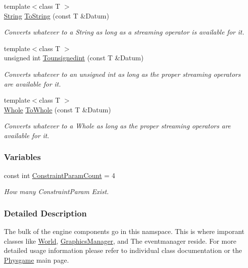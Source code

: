 \begin{DoxyCompactItemize}
{\footnotesize template$<$class T $>$ }\\\hyperlink{namespacephys_aa03900411993de7fbfec4789bc1d392e}{String} \hyperlink{namespacephys_ae81e34843c6c569026b9a7d9d54c4f04}{ToString} (const T \&Datum)
\begin{DoxyCompactList}\small\item\em Converts whatever to a String as long as a streaming operator is available for it. \item\end{DoxyCompactList}\item 
{\footnotesize template$<$class T $>$ }\\unsigned int \hyperlink{namespacephys_a16ab66903d5e438a04f4e859c8aa47a7}{Tounsignedint} (const T \&Datum)
\begin{DoxyCompactList}\small\item\em Converts whatever to an unsigned int as long as the proper streaming operators are available for it. \item\end{DoxyCompactList}\item 
{\footnotesize template$<$class T $>$ }\\\hyperlink{namespacephys_a460f6bc24c8dd347b05e0366ae34f34a}{Whole} \hyperlink{namespacephys_a53d44a46cab542ef86a541af5f1a7b62}{ToWhole} (const T \&Datum)
\begin{DoxyCompactList}\small\item\em Converts whatever to a Whole as long as the proper streaming operators are available for it. \item\end{DoxyCompactList}\end{DoxyCompactItemize}
\subsubsection*{Variables}
\begin{DoxyCompactItemize}
\item 
const int \hyperlink{namespacephys_ad2f68b6cd0ceaf38dac311ddea46cb4c}{ConstraintParamCount} = 4
\begin{DoxyCompactList}\small\item\em How many ConstraintParam Exist. \item\end{DoxyCompactList}\end{DoxyCompactItemize}


\subsubsection{Detailed Description}
The bulk of the engine components go in this namspace. This is where imporant classes like \hyperlink{classphys_1_1World}{World}, \hyperlink{classphys_1_1GraphicsManager}{GraphicsManager}, and The eventmanager reside. For more detailed usage information please refer to individual class documentation or the \hyperlink{index}{Physgame} main page. 

